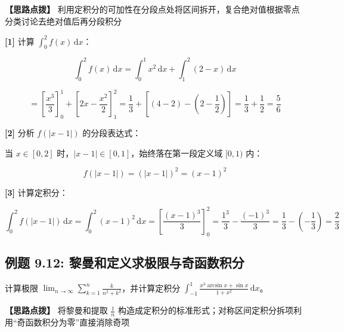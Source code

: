 \documentclass[11pt,a4paper,UTF8]{ctexart}
\begin{document}
\textbf{\color{DeepPurple}【思路点拨】} 利用定积分的可加性在分段点处将区间拆开，复合绝对值根据零点分类讨论去绝对值后再分段积分


\begin{solbox}[分步推导与答题规范]
\textbf{[1]} 计算 $\int_0^2 f(x)\,\mathrm{d}x$：


\begin{equation*}
\int_0^2 f(x)\,\mathrm{d}x = \int_0^1 x^2\,\mathrm{d}x + \int_1^2 (2-x)\,\mathrm{d}x
\end{equation*}



\begin{equation*}
= \left[ \frac{x^3}{3} \right]_0^1 + \left[ 2x - \frac{x^2}{2} \right]_1^2 = \frac{1}{3} + \left[(4-2) - \left(2-\frac{1}{2}\right)\right] = \frac{1}{3} + \frac{1}{2} = \frac{5}{6}
\end{equation*}


\textbf{[2]} 分析 $f(|x-1|)$ 的分段表达式：

当 $x \in [0, 2]$ 时，$|x-1| \in [0, 1]$，始终落在第一段定义域 $[0, 1)$ 内：


\begin{equation*}
f(|x-1|) = (|x-1|)^2 = (x-1)^2
\end{equation*}


\textbf{[3]} 计算定积分：


\begin{equation*}
\int_0^2 f(|x-1|)\,\mathrm{d}x = \int_0^2 (x-1)^2\,\mathrm{d}x = \left[ \frac{(x-1)^3}{3} \right]_0^2 = \frac{1^3}{3} - \frac{(-1)^3}{3} = \frac{1}{3} - \left(-\frac{1}{3}\right) = \frac{2}{3}
\end{equation*}

\end{solbox}


\subsection{例题 9.12: 黎曼和定义求极限与奇函数积分}

计算极限 $\lim_{n \to \infty} \sum_{k=1}^n \frac{k}{n^2+k^2}$，并计算定积分 $\int_{-1}^1 \frac{x^3\arcsin x + \sin x}{1+x^2}\,\mathrm{d}x$。

\textbf{\color{DeepPurple}【思路点拨】} 将黎曼和提取 $\frac{1}{n}$ 构造成定积分的标准形式；对称区间定积分拆项利用“奇函数积分为零”直接消除奇项
\end{document}
